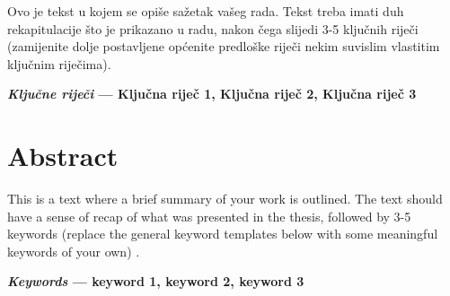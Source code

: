 \vspace{5pt}

\noindent
Ovo je tekst u kojem se opiše sažetak vašeg rada. Tekst treba imati duh rekapitulacije što je prikazano u radu, nakon čega slijedi 3-5 ključnih riječi (zamijenite dolje postavljene općenite predloške riječi nekim suvislim vlastitim ključnim riječima).

\vspace{5pt}
%
\noindent \textbf{\textit{Ključne riječi} --- Ključna riječ 1, Ključna riječ 2, Ključna riječ 3} 




\section*{Abstract}
\vspace{-10pt}
This is a text where a brief summary of your work is outlined. The text should have a sense of recap of what was presented in the thesis, followed by 3-5 keywords (replace the general keyword templates below with some meaningful keywords of your own) .

\vspace{5pt}
%
\noindent \textbf{\textit{Keywords} --- keyword 1, keyword 2, keyword 3}


